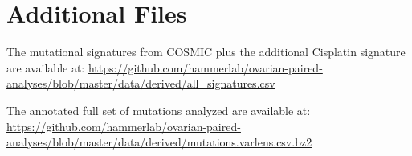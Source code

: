 \section*{Additional Files}

The mutational signatures from COSMIC plus the additional Cisplatin signature are available at: \url{https://github.com/hammerlab/ovarian-paired-analyses/blob/master/data/derived/all_signatures.csv}

The annotated full set of mutations analyzed are available at: \url{https://github.com/hammerlab/ovarian-paired-analyses/blob/master/data/derived/mutations.varlens.csv.bz2}